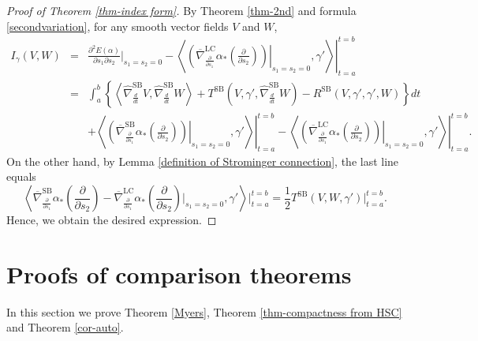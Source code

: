 \documentclass[12pt, reqno]{amsart}
\theoremstyle{plain}
\theoremstyle{definition}
\newcommand{\p}{\partial}
\renewcommand{\bar}{\overline}
\newcommand{\beq}{\begin{equation}}
\newcommand{\eeq}{\end{equation}}
\newcommand{\ee}{\end{eqnarray*}}
\newcommand{\be}{\begin{eqnarray*}}
\renewcommand{\hat}{\widehat}
\renewcommand{\>}{\rightarrow}
\newcommand{\LL}{\left\langle}
\newcommand{\RL}{\right\rangle}
\newcommand{\MS}{\mathrm{SB}}
\newcommand{\MLC}{\mathrm{LC}}
\renewcommand{\>}{\rightarrow}
\renewcommand{\p}{{\partial}}
\numberwithin{equation}{section} %
\begin{document}
   \begin{proof}[Proof of Theorem \ref{thm-index form}]
    By  Theorem \ref{thm-2nd} and formula \eqref{secondvariation},  for any smooth vector fields $V$ and $W$,
    \be
    I_\gamma(V,W)&=&\frac{\p^2E(\alpha)}{\p s_1\p s_2}\bigg|_{s_1=s_2=0}-\left.\LL\left.\left(\bar{\nabla}^\MLC_{\frac{\p}{\p s_1}}\alpha_*\left(\frac{\p}{\p s_2}\right)\right)\right|_{s_1=s_2=0},\gamma'\RL\right|_{t=a}^{t=b}\\
    &=&\int_a^b\left\{\LL\hat{\nabla}^{\MS}_{\frac{d}{d t}}V,\hat{\nabla}^{\MS}_{\frac{d}{d t}}W\RL+T^{\MS}\left(V,\gamma',\hat{\nabla}^{\MS}_{\frac{d}{d t}}W\right)-R^{\MS}(V,\gamma',\gamma',W)\right\}dt\\
    &&+\left.\LL\left.\left(\bar{\nabla}^\MS_{\frac{\p}{\p s_1}}\alpha_*\left(\frac{\p}{\p s_2}\right)\right)\right|_{s_1=s_2=0},\gamma'\RL\right|_{t=a}^{t=b}-\left.\LL\left.\left(\bar{\nabla}^\MLC_{\frac{\p}{\p s_1}}\alpha_*\left(\frac{\p}{\p s_2}\right)\right)\right|_{s_1=s_2=0},\gamma'\RL\right|_{t=a}^{t=b}.\ee
    On the other hand, by Lemma \ref{definition of Strominger connection}, the last line equals
    \beq \LL\bar{\nabla}^{\MS}_{\frac{\p}{\p s_1}}\alpha_*\left(\frac{\p}{\p s_2}\right)-\bar{\nabla}^{\MLC}_{\frac{\p}{\p s_1}}\alpha_*\left(\frac{\p}{\p s_2}\right)\bigg|_{s_1=s_2=0},\gamma'\RL\bigg|_{t=a}^{t=b}=\frac{1}{2}T^{\MS}(V,W,\gamma')\bigg|_{t=a}^{t=b}.
    \eeq
    Hence, we obtain the desired expression.
   \end{proof}



   \baselineskip



   \section{Proofs of comparison theorems}

   In this section we prove Theorem \ref{Myers},  Theorem \ref{thm-compactness from HSC} and Theorem \ref{cor-auto}.
\end{document}

